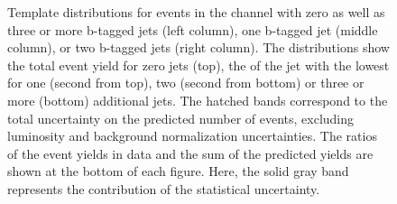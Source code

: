 \begin{figure}[htbp!]
\begin{center}
\caption{Template distributions for events in the \emu channel with zero as well as three or
  more b-tagged jets (left column), one b-tagged jet (middle column), or two b-tagged jets (right column). The distributions show the total event yield for zero jets (top), the \pt of the jet with the lowest \pt for one (second from top),
  two (second from bottom) or three or more (bottom) additional jets. 
  The hatched bands correspond to the total uncertainty on the predicted number of events, excluding luminosity and background
        normalization uncertainties.  The ratios of the event yields in data and the sum of the
  predicted yields are shown at the bottom of each figure. Here, the solid
  gray band represents the contribution of the statistical uncertainty.  
       \label{fig:xsec_emu_inputdistr}}
  \end{center}
\end{figure}

